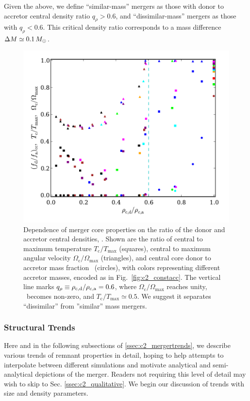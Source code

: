Given the above, we define ``similar-mass'' mergers as those with donor to accretor central density ratio $q_\rho>0.6$, and ``dissimilar-mass'' mergers as those with $q_\rho<0.6$.  This critical density ratio corresponds to a mass difference $\Delta M\simeq0.1\,\Msun$.

\begin{figure}
\centering
\includegraphics[width=0.6\columnwidth]{chapter2_zhu+13/figures/Eqmass.pdf}
\caption{Dependence of merger core properties on the ratio of the donor and accretor central densities, \rhocrat.  Shown are the ratio of central to maximum temperature $T_\mathrm{c}/T_\mathrm{max}$ (squares), central to maximum angular velocity $\Omega_\mathrm{c}/\Omega_\mathrm{max}$ (triangles), and central core donor to accretor mass fraction \fratio\ (circles), with colors representing different accretor masses, encoded as in Fig.~\ref{fig:c2_constacc}.  The vertical line marks $\qrho\equiv\rhocrat=0.6$, where $\Omega_\mathrm{c}/\Omega_\mathrm{max}$ reaches unity, \fratio\ becomes non-zero, and $T_\mathrm{c}/T_\mathrm{max}\simeq0.5$.  We suggest it separates ``dissimilar'' from ''similar'' mass mergers.}
\label{fig:c2_eqmass}
\end{figure}

\subsubsection{Structural Trends}
\label{sssec:c2_structuraltrends}

Here and in the following subsections of \ref{ssec:c2_mergertrends}, we describe various trends of remnant properties in detail, hoping to help attempts to interpolate between different simulations and motivate analytical and semi-analytical depictions of the merger.  Readers not requiring this level of detail may wish to skip to Sec. \ref{ssec:c2_qualitative}.  We begin our discussion of trends with size and density parameters.

